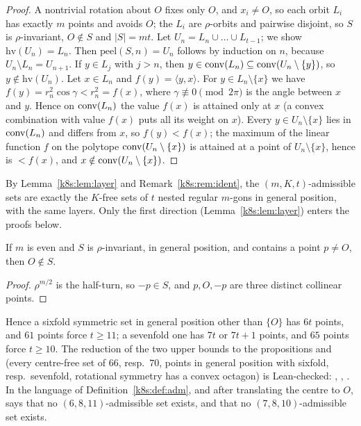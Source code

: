 \begin{proof}
A nontrivial rotation about $O$ fixes only $O$, and $x_i\ne O$, so each orbit $L_i$ has exactly $m$ points and avoids
$O$; the $L_i$ are $\rho$-orbits and pairwise disjoint, so $S$ is $\rho$-invariant, $O\notin S$ and $|S|=mt$. Let
$U_n=L_n\cup\dots\cup L_{t-1}$; we show $\mathrm{hv}(U_n)=L_n$. Then $\mathrm{peel}(S,n)=U_n$ follows by induction on $n$,
because $U_n\setminus L_n=U_{n+1}$.
If $y\in L_j$ with $j>n$, then $y\in\operatorname{conv}(L_n)\subseteq\operatorname{conv}(U_n\setminus\{y\})$, so $y\notin\mathrm{hv}(U_n)$. Let
$x\in L_n$ and $f(y)=\langle y,x\rangle$. For $y\in L_n\setminus\{x\}$ we have $f(y)=r_n^2\cos\gamma<r_n^2=f(x)$, where
$\gamma\not\equiv0\pmod{2\pi}$ is the angle between $x$ and $y$. Hence on $\operatorname{conv}(L_n)$ the value $f(x)$ is attained only at
$x$ (a convex combination with value $f(x)$ puts all its weight on $x$). Every $y\in U_n\setminus\{x\}$ lies in
$\operatorname{conv}(L_n)$ and differs from $x$, so $f(y)<f(x)$; the maximum of the linear function $f$ on the polytope
$\operatorname{conv}(U_n\setminus\{x\})$ is attained at a point of $U_n\setminus\{x\}$, hence is $<f(x)$, and $x\notin\operatorname{conv}(U_n\setminus\{x\})$.
\end{proof}

By Lemma~\ref{k8s:lem:layer} and Remark~\ref{k8s:rem:ident}, the $(m,K,t)$-admissible sets are exactly the $K$-free
sets of $t$ nested regular $m$-gons in general position, with the same layers. Only the first direction
(Lemma~\ref{k8s:lem:layer}) enters the proofs below.

\begin{lemma}\label{k8s:lem:centre}
If $m$ is even and $S$ is $\rho$-invariant, in general position, and contains a point $p\ne O$, then $O\notin S$.
\end{lemma}

\begin{proof}
$\rho^{m/2}$ is the half-turn, so $-p\in S$, and $p,O,-p$ are three distinct collinear points.
\end{proof}

Hence a sixfold symmetric set in general position other than $\{O\}$ has $6t$ points, and $61$ points force $t\ge11$;
a sevenfold one has $7t$ or $7t+1$ points, and $65$ points force $t\ge10$. The reduction of the two upper bounds to
the propositions  and  (every centre-free set of $66$, resp.\ $70$, points in general
position with sixfold, resp.\ sevenfold, rotational symmetry has a convex octagon) is Lean-checked:
, , . In the language of
Definition~\ref{k8s:def:adm}, and after translating the centre to $O$,  says that no
$(6,8,11)$-admissible set exists, and  that no $(7,8,10)$-admissible set exists.

